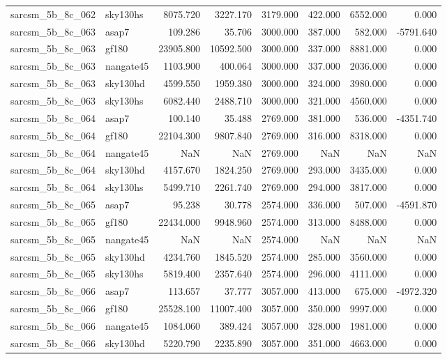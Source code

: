 \begin{tabular}{llrrrrrr}
sarcsm\_5b\_8c\_062 & sky130hs & 8075.720 & 3227.170 & 3179.000 & 422.000 & 6552.000 & 0.000 \\
sarcsm\_5b\_8c\_063 & asap7 & 109.286 & 35.706 & 3000.000 & 387.000 & 582.000 & -5791.640 \\
sarcsm\_5b\_8c\_063 & gf180 & 23905.800 & 10592.500 & 3000.000 & 337.000 & 8881.000 & 0.000 \\
sarcsm\_5b\_8c\_063 & nangate45 & 1103.900 & 400.064 & 3000.000 & 337.000 & 2036.000 & 0.000 \\
sarcsm\_5b\_8c\_063 & sky130hd & 4599.550 & 1959.380 & 3000.000 & 324.000 & 3980.000 & 0.000 \\
sarcsm\_5b\_8c\_063 & sky130hs & 6082.440 & 2488.710 & 3000.000 & 321.000 & 4560.000 & 0.000 \\
sarcsm\_5b\_8c\_064 & asap7 & 100.140 & 35.488 & 2769.000 & 381.000 & 536.000 & -4351.740 \\
sarcsm\_5b\_8c\_064 & gf180 & 22104.300 & 9807.840 & 2769.000 & 316.000 & 8318.000 & 0.000 \\
sarcsm\_5b\_8c\_064 & nangate45 & NaN & NaN & 2769.000 & NaN & NaN & NaN \\
sarcsm\_5b\_8c\_064 & sky130hd & 4157.670 & 1824.250 & 2769.000 & 293.000 & 3435.000 & 0.000 \\
sarcsm\_5b\_8c\_064 & sky130hs & 5499.710 & 2261.740 & 2769.000 & 294.000 & 3817.000 & 0.000 \\
sarcsm\_5b\_8c\_065 & asap7 & 95.238 & 30.778 & 2574.000 & 336.000 & 507.000 & -4591.870 \\
sarcsm\_5b\_8c\_065 & gf180 & 22434.000 & 9948.960 & 2574.000 & 313.000 & 8488.000 & 0.000 \\
sarcsm\_5b\_8c\_065 & nangate45 & NaN & NaN & 2574.000 & NaN & NaN & NaN \\
sarcsm\_5b\_8c\_065 & sky130hd & 4234.760 & 1845.520 & 2574.000 & 285.000 & 3560.000 & 0.000 \\
sarcsm\_5b\_8c\_065 & sky130hs & 5819.400 & 2357.640 & 2574.000 & 296.000 & 4111.000 & 0.000 \\
sarcsm\_5b\_8c\_066 & asap7 & 113.657 & 37.777 & 3057.000 & 413.000 & 675.000 & -4972.320 \\
sarcsm\_5b\_8c\_066 & gf180 & 25528.100 & 11007.400 & 3057.000 & 350.000 & 9997.000 & 0.000 \\
sarcsm\_5b\_8c\_066 & nangate45 & 1084.060 & 389.424 & 3057.000 & 328.000 & 1981.000 & 0.000 \\
sarcsm\_5b\_8c\_066 & sky130hd & 5220.790 & 2235.890 & 3057.000 & 351.000 & 4663.000 & 0.000 \\

\end{tabular}
